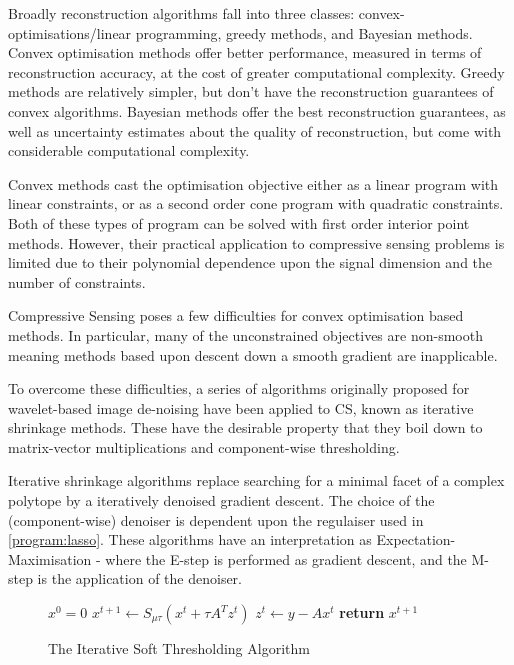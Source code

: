 
Broadly reconstruction algorithms fall into three classes: convex-optimisations/linear programming, greedy methods, and Bayesian methods. Convex optimisation methods offer better performance, measured in terms of reconstruction accuracy, at the cost of greater computational complexity. Greedy methods are relatively simpler, but don't have the reconstruction guarantees of convex algorithms. Bayesian methods offer the best reconstruction guarantees, as well as uncertainty estimates about the quality of reconstruction, but come with considerable computational complexity.


Convex methods cast the optimisation objective either as a linear program with linear constraints, or as a second order cone program with quadratic constraints. Both of these types of program can be solved with first order interior point methods. However, their practical application to compressive sensing problems is limited due to their polynomial dependence upon the signal dimension and the number of constraints. 

Compressive Sensing poses a few difficulties for convex optimisation based methods. In particular, many of the unconstrained objectives are non-smooth meaning methods based upon descent down a smooth gradient are inapplicable. 

To overcome these difficulties, a series of algorithms originally proposed for wavelet-based image de-noising have been applied to CS, known as iterative shrinkage methods. These have the desirable property that they boil down to matrix-vector multiplications and component-wise thresholding.

Iterative shrinkage algorithms replace searching for a minimal facet of a complex polytope by a iteratively denoised gradient descent. The choice of the (component-wise) denoiser is dependent upon the regulaiser used in \ref{program:lasso}. These algorithms have an interpretation as Expectation-Maximisation \cite{figueiredo2003algorithm} - where the E-step is performed as gradient descent, and the M-step is the application of the denoiser.

\begin{figure}
\begin{algorithmic}[1]
\State $x^0 = 0$
\State $x^{t+1} \gets S_{\mu\tau}\left(x^t + \tau A^Tz^t \right) $
\State $z^t \gets y - Ax^t$
\EndWhile
\State \textbf{return} $x^{t+1}$
\EndProcedure
\end{algorithmic}
\caption{The Iterative Soft Thresholding Algorithm}\label{alg:IST}
\end{figure}

